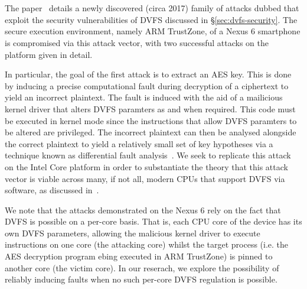 \section{\clkscrew{}}

The \clkscrew{} paper~\cite{clkscrew} details a newly discovered (circa 2017)
family of attacks dubbed \clkscrew{} that exploit the security vulnerabilities
of DVFS discussed in §\ref{sec:dvfs-security}. The secure execution environment,
namely ARM TrustZone, of a Nexus 6 smartphone is compromised via this attack
vector, with two successful attacks on the platform given in detail.

In particular, the goal of the first attack is to extract an AES key. This is
done by inducing a precise computational fault during decryption of a ciphertext
to yield an incorrect plaintext. The fault is induced with the aid of a
mailicious kernel driver that alters DVFS paramters as and when required. This
code must be executed in kernel mode since the instructions that allow DVFS
paramters to be altered are privileged. The incorrect plaintext can then be
analysed alongside the correct plaintext to yield a relatively small set of key 
hypotheses via a technique known as differential fault analysis~\cite{tunstallDFA}.
We seek to replicate this attack on the Intel Core platform in order to
substantiate the theory that this attack vector is viable across many, if not
all, modern CPUs that support DVFS via software, as discussed in~\cite[§6.1]{clkscrew}.

We note that the attacks demonstrated on the Nexus 6 rely on the fact that DVFS
is possible on a per-core basis. That is, each CPU core of the device has its
own DVFS parameters, allowing the malicious kernel driver to execute
instructions on one core (the attacking core) whilst the target process (i.e.
the AES decryption program ebing executed in ARM TrustZone) is pinned to another
core (the victim core). In our reserach, we explore the possibility of reliably
inducing faults when no such per-core DVFS regulation is possible.
